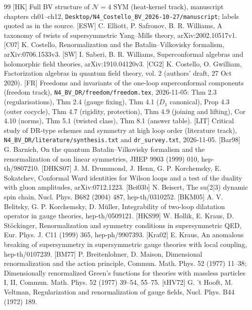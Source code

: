 
\begin{thebibliography}{99}
 [HK] Full BV structure of $\mathcal N=4$ SYM (heat-kernel track), manuscript chapters ch01--ch12, \texttt{Desktop/N4\_Costello\_BV\_2026-10-27/manuscript}; labels quoted as in the source.
 [ESW] C. Elliott, P. Safronov, B. R. Williams, A taxonomy of twists of supersymmetric Yang--Mills theory, arXiv:2002.10517v1.
 [C07] K. Costello, Renormalization and the Batalin--Vilkovisky formalism, arXiv:0706.1533v3.
 [SW] I. Saberi, B. R. Williams, Superconformal algebras and holomorphic field theories, arXiv:1910.04120v3.
 [CG2] K. Costello, O. Gwilliam, Factorization algebras in quantum field theory, vol. 2 (authors' draft, 27 Oct 2020).
 [FR] Freedoms and invariants of the one-loop superconformal components (freedom track), \texttt{N4\_BV\_DR/freedom/freedom.tex}, 2026-11-05: Thm 2.3 (regularisations), Thm 2.4 (gauge fixing), Thm 4.1 ($D_1$ canonical), Prop 4.3 (outer cocycle), Thm 4.7 (rigidity, protection), Thm 4.9 (joining and lifting), Cor 4.10 (norms), Thm 5.1 (twisted class), Thm 8.1 (answer table).
 [LIT] Critical study of DR-type schemes and symmetry at high loop order (literature track), \texttt{N4\_BV\_DR/literature/synthesis.txt} and \texttt{dr\_survey.txt}, 2026-11-05.
 [Bar98] G. Barnich, On the quantum Batalin--Vilkovisky formalism and the renormalization of non linear symmetries, JHEP 9903 (1999) 010, hep-th/9807210.
 [DHKS07] J. M. Drummond, J. Henn, G. P. Korchemsky, E. Sokatchev, Conformal Ward identities for Wilson loops and a test of the duality with gluon amplitudes, arXiv:0712.1223.
 [Bei03b] N. Beisert, The su(2|3) dynamic spin chain, Nucl. Phys. B682 (2004) 487, hep-th/0310252.
 [BKM05] A. V. Belitsky, G. P. Korchemsky, D. M\"uller, Integrability of two-loop dilatation operator in gauge theories, hep-th/0509121.
 [HKS99] W. Hollik, E. Kraus, D. St\"ockinger, Renormalization and symmetry conditions in supersymmetric QED, Eur. Phys. J. C11 (1999) 365, hep-ph/9907393.
 [Kra02] E. Kraus, An anomalous breaking of supersymmetry in supersymmetric gauge theories with local coupling, hep-th/0107239.
 [BM77] P. Breitenlohner, D. Maison, Dimensional renormalization and the action principle, Commun. Math. Phys. 52 (1977) 11--38; Dimensionally renormalized Green's functions for theories with massless particles I, II, Commun. Math. Phys. 52 (1977) 39--54, 55--75.
 [tHV72] G. 't Hooft, M. Veltman, Regularization and renormalization of gauge fields, Nucl. Phys. B44 (1972) 189.

\end{thebibliography}
